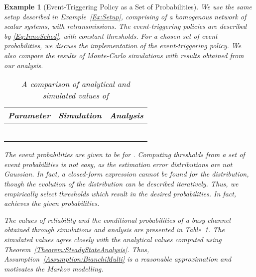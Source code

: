 \documentclass[journal]{IEEEtran}
\newtheorem{example}{Example}[section]
\begin{document}
\begin{example}[Event-Triggering Policy as a Set of Probabilities] \label{Ex:Setup2}
We use the same setup described in Example~\ref{Ex:Setup}, comprising of a homogenous network of  scalar systems, with  retransmissions. The event-triggering policies are described by \eqref{Eq:InnoSched}, with constant thresholds. For a chosen set of event probabilities, we discuss the implementation of the event-triggering policy. We also compare the results of Monte-Carlo simulations with results obtained from our analysis.

\begin{table}[!t]
\begin{center}
\caption{A comparison of analytical and simulated values of }\label{Tb:SimResults}
\begin{tabular}{c | c c}
\hline\hline Parameter & Simulation & Analysis \\ \hline
 &  &  \\
 &  &  \\
 &  &  \\
 &  &  \\
 &  &  \\
 &  &  \\
\hline
\end{tabular}
\end{center}
\vspace{-2mm}
\end{table}

The event probabilities are given to be  for . Computing thresholds from a set of event probabilities is not easy, as the estimation error distributions are not Gaussian. In fact, a closed-form expression cannot be found for the distribution, though the evolution of the distribution can be described iteratively. Thus, we empirically select thresholds which result in the desired probabilities. In fact,  achieves the given probabilities.

The values of reliability and the conditional probabilities of a busy channel obtained through simulations and analysis are presented in Table~\ref{Tb:SimResults}. The simulated values agree closely with the analytical values computed using Theorem~\ref{Theorem:SteadyStateAnalysis}. Thus, Assumption~\ref{Assumption:BianchiMulti} is a reasonable approximation and motivates the Markov modelling.
\end{example}
\end{document}
